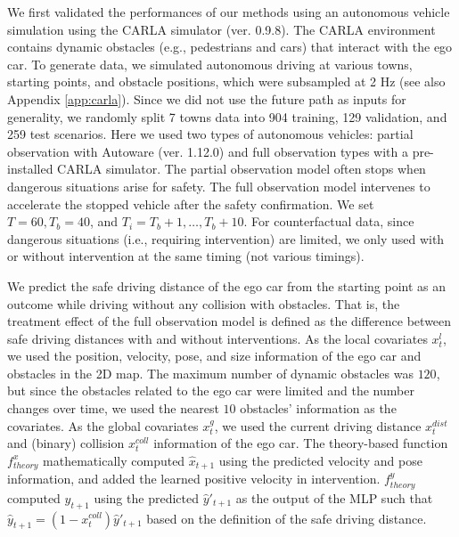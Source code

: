 \documentclass[journal]{IEEEtran}
\begin{document}
We first validated the performances of our methods using an autonomous vehicle simulation using the CARLA simulator \cite{dosovitskiy2017carla} (ver. 0.9.8). 
The CARLA environment contains dynamic obstacles (e.g., pedestrians and cars) that interact with the ego car. 
To generate data, we simulated autonomous driving at various towns, starting points, and obstacle positions, which were subsampled at 2 Hz (see also Appendix \ref{app:carla}).
Since we did not use the future path as inputs for generality, we randomly split 7 towns data into 904 training, 129 validation, and 259 test scenarios. %
Here we used two types of autonomous vehicles: partial observation with Autoware \cite{kato2015open} (ver. 1.12.0) and full observation types with a pre-installed CARLA simulator. 
The partial observation model often stops when dangerous situations arise for safety. 
The full observation model intervenes to accelerate the stopped vehicle after the safety confirmation. 
We set $T=60, T_b=40$, and $T_i=T_b+1,\ldots,T_b+10$. %
For counterfactual data, since dangerous situations (i.e., requiring intervention) are limited, we only used with or without intervention at the same timing (not various timings). %

We predict the safe driving distance of the ego car from the starting point as an outcome while driving without any collision with obstacles. 
That is, the treatment effect of the full observation model is defined as the difference between safe driving distances with and without interventions.
As the local covariates $x^l_t$, we used the position, velocity, pose, and size information of the ego car and obstacles in the 2D map.
The maximum number of dynamic obstacles was $120$, but since the obstacles related to the ego car were limited and the number changes over time, we used the nearest $10$ obstacles' information as the covariates. 
As the global covariates $x^g_t$, we used the current driving distance $x_t^{dist}$ and (binary) collision $x_t^{coll}$ information of the ego car.
The theory-based function $f^x_{theory}$ mathematically computed $\hat{x}_{t+1}$ using the predicted velocity and pose information, and added the learned positive velocity in intervention.
$f^y_{theory}$ computed $\hat{y}_{t+1}$ using the predicted $\hat{y}'_{t+1}$ as the output of the MLP such that $\hat{y}_{t+1} = (1-x_t^{coll})\hat{y}'_{t+1}$ based on the definition of the safe driving distance.
\end{document}
